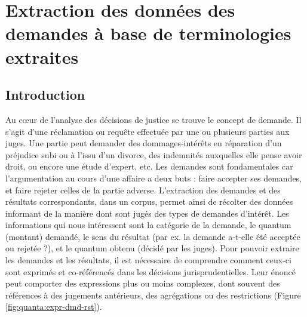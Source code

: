 \chapter{Extraction des données des demandes à base de terminologies extraites}
\label{chap:quanta}

\section{Introduction}
\label{sec:quanta:introduction}
Au c\oe{}ur de l'analyse des décisions de justice se trouve le concept de demande. Il s'agit d'une réclamation ou requête effectuée par une ou plusieurs parties aux juges. Une partie peut demander des dommages-intérêts en réparation d'un préjudice subi ou à l'issu d'un divorce, des indemnités auxquelles elle pense avoir droit, ou encore une étude d'expert, etc. Les demandes sont fondamentales car l'argumentation au cours d'une affaire a deux buts : faire accepter ses demandes, et faire rejeter celles de la partie adverse. L'extraction des demandes et des résultats correspondants, dans un corpus, permet ainsi de récolter des données informant de la manière dont sont jugés des types de demandes d'intérêt. Les informations qui nous intéressent sont la catégorie de la demande, le quantum (montant) demandé, le sens du résultat (par ex. la demande a-t-elle été acceptée ou rejetée ?), et le quantum obtenu (décidé par les juges). Pour pouvoir extraire les demandes et les résultats, il est nécessaire de comprendre comment ceux-ci sont exprimés et co-référencés dans les décisions jurisprudentielles. Leur énoncé peut comporter des expressions plus ou moins complexes, dont souvent des références à des jugements antérieurs, des agrégations ou des restrictions (Figure \ref{fig:quanta:expr-dmd-rst}).

